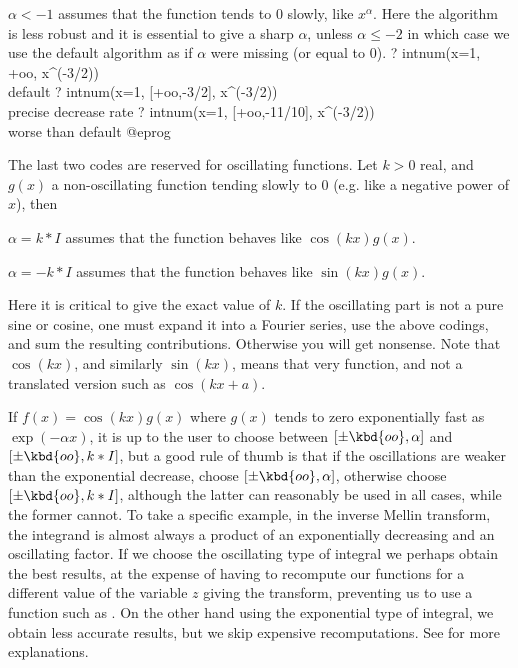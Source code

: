 \item $\alpha<-1$ assumes that the function tends to $0$ slowly, like
$x^{\alpha}$. Here the algorithm is less robust and it is essential to give a
sharp $\alpha$, unless $\alpha \le -2$ in which case we use
the default algorithm as if $\alpha$ were missing (or equal to $0$).
\bprog
? intnum(x=1, +oo, x^(-3/2))         \\ default
? intnum(x=1, [+oo,-3/2], x^(-3/2))  \\ precise decrease rate
? intnum(x=1, [+oo,-11/10], x^(-3/2)) \\ worse than default
@eprog

\smallskip The last two codes are reserved for oscillating functions.
Let $k > 0$ real, and $g(x)$ a non-oscillating function tending slowly to $0$
(e.g. like a negative power of $x$), then

\item $\alpha=k * I$ assumes that the function behaves like $\cos(kx)g(x)$.

\item $\alpha=-k* I$ assumes that the function behaves like $\sin(kx)g(x)$.

\noindent Here it is critical to give the exact value of $k$. If the
oscillating part is not a pure sine or cosine, one must expand it into a
Fourier series, use the above codings, and sum the resulting contributions.
Otherwise you will get nonsense. Note that $\cos(kx)$, and similarly
$\sin(kx)$, means that very function, and not a translated version such as
$\cos(kx+a)$.

 If $f(x)=\cos(kx)g(x)$ where $g(x)$ tends to zero
exponentially fast as $\exp(-\alpha x)$, it is up to the user to choose
between $[\pm\kbd{oo},\alpha]$ and $[\pm\kbd{oo},k* I]$, but a good rule of
thumb is that
if the oscillations are weaker than the exponential decrease, choose
$[\pm\kbd{oo},\alpha]$, otherwise choose $[\pm\kbd{oo},k*I]$, although the
latter can
reasonably be used in all cases, while the former cannot. To take a specific
example, in the inverse Mellin transform, the integrand is almost always a
product of an exponentially decreasing and an oscillating factor. If we
choose the oscillating type of integral we perhaps obtain the best results,
at the expense of having to recompute our functions for a different value of
the variable $z$ giving the transform, preventing us to use a function such
as . On the other hand using the exponential type of
integral, we obtain less accurate results, but we skip expensive
recomputations. See  for more explanations.

